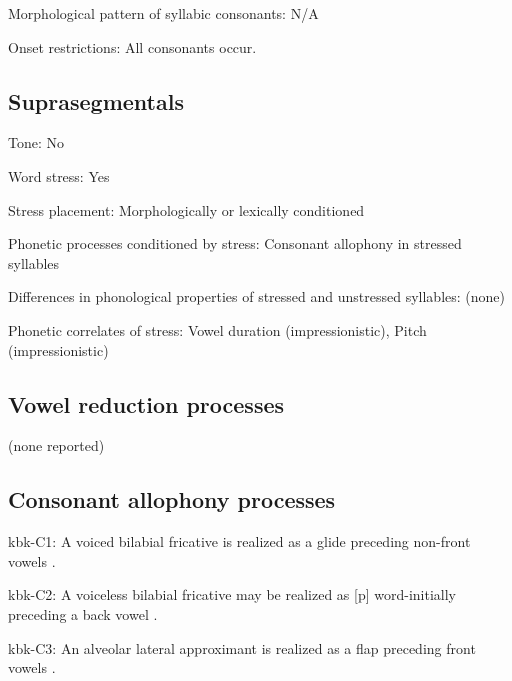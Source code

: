 {\begin{appendixdesc}
\item[Morphological pattern of syllabic consonants:] N/A

\item[Onset restrictions:] All consonants occur.
\end{appendixdesc}
\subsection*{Suprasegmentals}
\begin{appendixdesc}
\item[Tone:] No

\item[Word stress:] Yes

\item[Stress placement:] Morphologically or lexically conditioned

\item[Phonetic processes conditioned by stress:] Consonant allophony in stressed syllables

\item[Differences in phonological properties of stressed and unstressed syllables:] (none) 

\item[Phonetic correlates of stress:] Vowel duration (impressionistic), Pitch (impressionistic)
\end{appendixdesc}
\subsection*{Vowel reduction processes}

(none reported)
\subsection*{Consonant allophony processes}
\begin{appendixdesc}

\item[kbk-C1:] A voiced bilabial fricative is realized as a glide preceding non-front vowels \citep{Dutton1996}.

\item[kbk-C2:] A voiceless bilabial fricative may be realized as [p] word-initially preceding a back vowel \citep{Dutton1996}.

\item[kbk-C3:] An alveolar lateral approximant is realized as a flap preceding front vowels \citep{Dutton1996}.
\end{appendixdesc}
}
